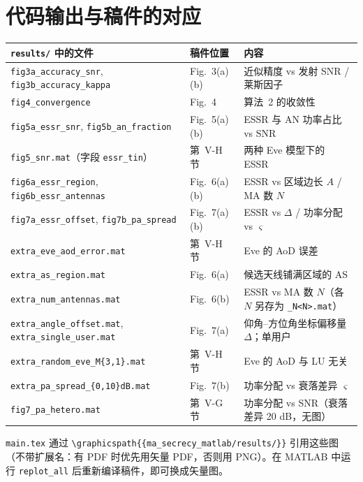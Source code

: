 \documentclass[11pt,a4paper]{ctexart}
\newcommand{\code}[1]{\texttt{#1}}
\begin{document}
\section{代码输出与稿件的对应}
\begin{center}\footnotesize
\begin{tabular}{lll}
\toprule
\code{results/} 中的文件 & 稿件位置 & 内容 \\ \midrule
\code{fig3a\_accuracy\_snr}, \code{fig3b\_accuracy\_kappa} & Fig.~3(a)(b) & 近似精度 vs 发射 SNR / 莱斯因子 \\
\code{fig4\_convergence} & Fig.~4 & 算法~2 的收敛性 \\
\code{fig5a\_essr\_snr}, \code{fig5b\_an\_fraction} & Fig.~5(a)(b) & ESSR 与 AN 功率占比 vs SNR \\
\code{fig5\_snr.mat}（字段 \code{essr\_tin}） & 第~V-H 节 & 两种 Eve 模型下的 ESSR \\
\code{fig6a\_essr\_region}, \code{fig6b\_essr\_antennas} & Fig.~6(a)(b) & ESSR vs 区域边长 $A$ / MA 数 $N$ \\
\code{fig7a\_essr\_offset}, \code{fig7b\_pa\_spread} & Fig.~7(a)(b) & ESSR vs $\Delta$ / 功率分配 vs $\varsigma$ \\
\code{extra\_eve\_aod\_error.mat} & 第~V-H 节 & Eve 的 AoD 误差 \\
\code{extra\_as\_region.mat} & Fig.~6(a) & 候选天线铺满区域的 AS \\
\code{extra\_num\_antennas.mat} & Fig.~6(b) & ESSR vs MA 数 $N$（各 $N$ 另存为 \code{\_N<N>.mat}）\\
\code{extra\_angle\_offset.mat}, \code{extra\_single\_user.mat} & Fig.~7(a) & 仰角--方位角坐标偏移量 $\Delta$；单用户 \\
\code{extra\_random\_eve\_M\{3,1\}.mat} & 第~V-H 节 & Eve 的 AoD 与 LU 无关 \\
\code{extra\_pa\_spread\_\{0,10\}dB.mat} & Fig.~7(b) & 功率分配 vs 衰落差异 $\varsigma$ \\
\code{fig7\_pa\_hetero.mat} & 第~V-G 节 & 功率分配 vs SNR（衰落差异 20 dB，无图）\\
\bottomrule
\end{tabular}
\end{center}
\code{main.tex} 通过 \code{\textbackslash graphicspath\{\{ma\_secrecy\_matlab/results/\}\}} 引用这些图（不带扩展名：有 PDF 时优先用矢量 PDF，否则用 PNG）。在 MATLAB 中运行 \code{replot\_all} 后重新编译稿件，即可换成矢量图。

\end{document}
